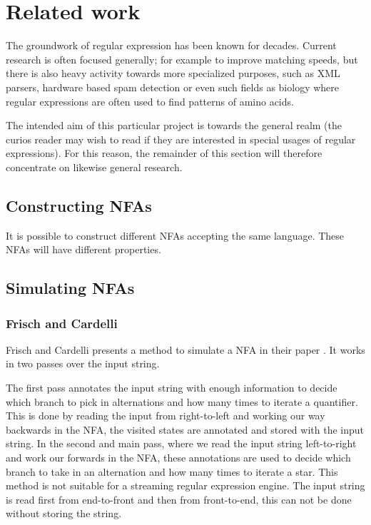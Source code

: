 \section{Related work}
\label{sec:related}

The groundwork of regular expression has been known for
decades. Current research is often focused generally; for
example to improve matching speeds, but there is also heavy activity
towards more specialized purposes, such as XML parsers, hardware based spam
detection or even such fields as biology where regular expressions are
often used to find patterns of amino acids. 

The intended aim of this particular project is towards the general
realm (the curios reader may wish to read \cite{pedersen2010} if they
are interested in special usages of regular expressions). For this
reason, the remainder of this section will therefore concentrate on
likewise general research.



\subsection{Constructing NFAs}

It is possible to construct different NFAs accepting the same
language. These NFAs will have different properties. 


\subsection{Simulating NFAs}
\subsubsection{Frisch and Cardelli}

Frisch and Cardelli presents a method to simulate a NFA in their paper
\cite{2004:GreedyRegularExpressionMatching}. It works in two passes
over the input string. 

The first pass annotates the input string with
enough information to decide which branch to pick in alternations and
how many times to iterate a quantifier. This is done by reading the
input from right-to-left and working our way backwards in the NFA, the
visited states are annotated and stored with the input string. In the
second and main pass, where we read the input string left-to-right and
work our forwards in the NFA, these annotations are used to decide
which branch to take in an alternation and how many times to iterate a
star. This method is not suitable for a streaming regular expression
engine. The input string is read first from end-to-front and then from
front-to-end, this can not be done without storing the string.

